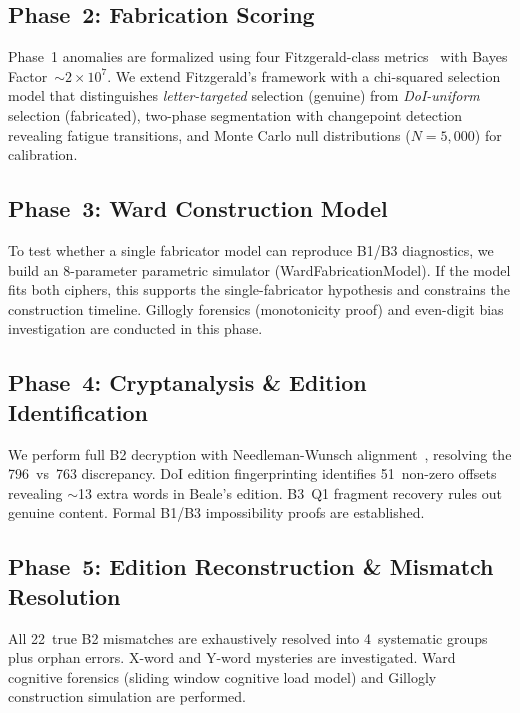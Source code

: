 \documentclass[11pt,a4paper]{article}
\begin{document}
\subsection{Phase~2: Fabrication Scoring}

Phase~1 anomalies are formalized using four Fitzgerald-class
metrics~\cite{fitzgerald2024} with Bayes Factor~$\sim 2 \times 10^7$.
We extend Fitzgerald's framework with a chi-squared selection model
that distinguishes \emph{letter-targeted} selection (genuine) from
\emph{DoI-uniform} selection (fabricated), two-phase segmentation with
changepoint detection revealing fatigue transitions, and Monte Carlo
null distributions ($N{=}5{,}000$) for calibration.

\subsection{Phase~3: Ward Construction Model}

To test whether a single fabricator model can reproduce B1/B3
diagnostics, we build an 8-parameter parametric simulator
(WardFabricationModel). If the model fits both ciphers, this supports
the single-fabricator hypothesis and constrains the construction
timeline. Gillogly forensics (monotonicity proof) and even-digit bias
investigation are conducted in this phase.

\subsection{Phase~4: Cryptanalysis \& Edition Identification}

We perform full B2 decryption with Needleman-Wunsch
alignment~\cite{needleman1970}, resolving the 796~vs~763 discrepancy.
DoI edition fingerprinting identifies 51~non-zero offsets revealing
$\sim$13 extra words in Beale's edition. B3~Q1 fragment recovery
rules out genuine content. Formal B1/B3 impossibility proofs are
established.

\subsection{Phase~5: Edition Reconstruction \& Mismatch Resolution}

All 22~true B2 mismatches are exhaustively resolved into 4~systematic
groups plus orphan errors. X-word and Y-word mysteries are investigated.
Ward cognitive forensics (sliding window cognitive load model) and
Gillogly construction simulation are performed.
\end{document}
